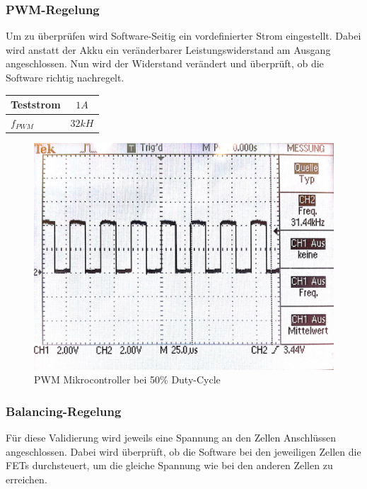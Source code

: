 \subsubsection*{PWM-Regelung}
Um zu überprüfen wird Software-Seitig ein vordefinierter Strom eingestellt. Dabei wird anstatt der Akku ein veränderbarer Leistungswiderstand am Ausgang angeschlossen. Nun wird der Widerstand verändert und überprüft, ob die Software richtig nachregelt.
\begin{center}
	\begin{tabular}{l|c}
		\hline 
		Teststrom & $1A$ \\ \hline
		${f}_{PWM}$ & $32kH$ \\ \hline
	\end{tabular} 
	\label{tab:LadestromHighsideDriver}
\end{center}

\begin{figure} [H]
	\centering
	\includegraphics[width=0.5\linewidth]{images/PWM.jpg}
	\caption{PWM Mikrocontroller bei 50\% Duty-Cycle}
	\label{fig:PWM uC}
\end{figure}

\subsubsection{Balancing-Regelung}
Für diese Validierung wird jeweils eine Spannung an den Zellen Anschlüssen angeschlossen. Dabei wird überprüft, ob die Software bei den jeweiligen Zellen die FETs durchsteuert, um  die gleiche Spannung wie bei den anderen Zellen zu erreichen.



